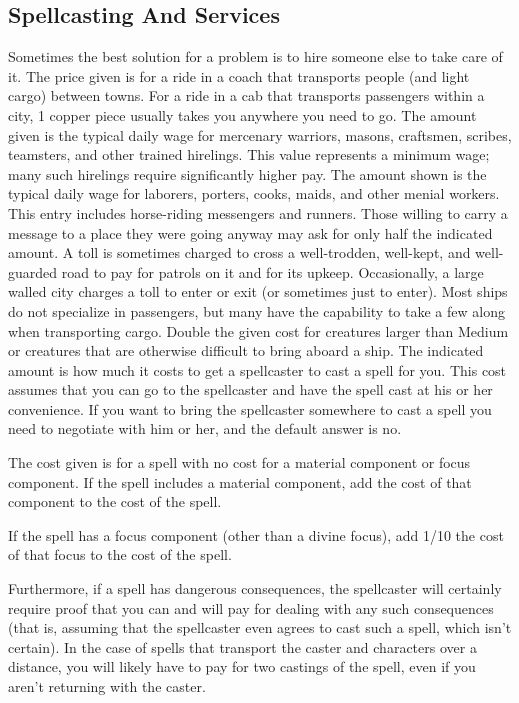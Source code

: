 \subsection{Spellcasting And Services}
Sometimes the best solution for a problem is to hire someone else to take care of it.
 The price given is for a ride in a coach that transports people (and light cargo) between towns. For a ride in a cab that transports passengers within a city, 1 copper piece usually takes you anywhere you need to go.
 The amount given is the typical daily wage for mercenary warriors, masons, craftsmen, scribes, teamsters, and other trained hirelings. This value represents a minimum wage; many such hirelings require significantly higher pay.
 The amount shown is the typical daily wage for laborers, porters, cooks, maids, and other menial workers.
 This entry includes horse-riding messengers and runners. Those willing to carry a message to a place they were going anyway may ask for only half the indicated amount.
 A toll is sometimes charged to cross a well-trodden, well-kept, and well-guarded road to pay for patrols on it and for its upkeep. Occasionally, a large walled city charges a toll to enter or exit (or sometimes just to enter).
 Most ships do not specialize in passengers, but many have the capability to take a few along when transporting cargo. Double the given cost for creatures larger than Medium or creatures that are otherwise difficult to bring aboard a ship.
 The indicated amount is how much it costs to get a spellcaster to cast a spell for you. This cost assumes that you can go to the spellcaster and have the spell cast at his or her convenience. If you want to bring the spellcaster somewhere to cast a spell you need to negotiate with him or her, and the default answer is no.
\par The cost given is for a spell with no cost for a material component or focus component. If the spell includes a material component, add the cost of that component to the cost of the spell.
\par If the spell has a focus component (other than a divine focus), add 1/10 the cost of that focus to the cost of the spell.
\par Furthermore, if a spell has dangerous consequences, the spellcaster will certainly require proof that you can and will pay for dealing with any such consequences (that is, assuming that the spellcaster even agrees to cast such a spell, which isn't certain). In the case of spells that transport the caster and characters over a distance, you will likely have to pay for two castings of the spell, even if you aren't returning with the caster.
